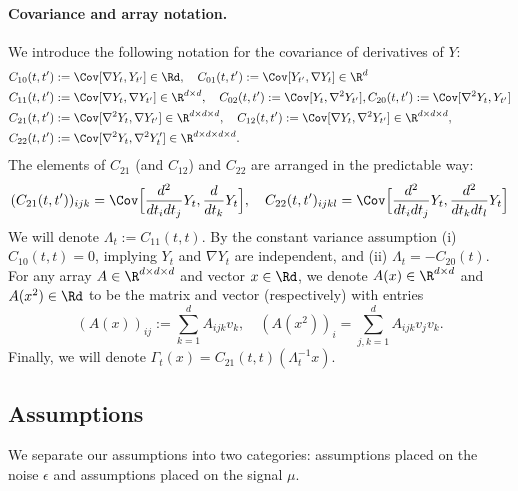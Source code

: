 \documentclass{article}
\begin{document}
	\paragraph{Covariance and array notation.}
	We introduce the following notation for the covariance of derivatives of $Y$:
	\begin{align*}
		C_{10}(t,t') & := \Cov[\nabla Y_t, Y_{t'}] \in \Rd, \quad  C_{01}(t,t') := \Cov[Y_{t'},\nabla Y_t] \in \R^{d}\\
		C_{11}(t,t') & := \Cov[\nabla Y_t,\nabla Y_{t'}] \in \R^{d \times d}, \quad C_{02}(t,t') := \Cov[Y_t,\nabla^2 Y_{t'}], C_{20}(t,t') := \Cov[\nabla^2 Y_t,Y_{t'}] \\
		C_{21}(t,t') & := \Cov[\nabla^2 Y_t, \nabla Y_{t'}] \in \R^{d \times d \times d}, \quad C_{12}(t,t') :=  \Cov[\nabla Y_t, \nabla^2 Y_{t'}] \in \R^{d \times d \times d},\\
		C_{22}(t,t') & := \Cov[\nabla^2 Y_t, \nabla^2 Y_t'] \in \R^{d \times d \times d \times d}.
	\end{align*}
	The elements of $C_{21}$ (and $C_{12}$) and $C_{22}$ are arranged in the predictable way: 
	$$
	(C_{21}(t,t'))_{ijk} = \Cov\Big[\frac{d^2}{dt_i dt_j}Y_t, \frac{d}{dt_k}Y_t\Big], \quad C_{22}(t,t')_{ijkl} = \Cov\Big[\frac{d^2}{dt_i dt_j}Y_t, \frac{d^2}{dt_k dt_l}Y_t\Big]
	$$
	We will denote $\Lambda_t := C_{11}(t,t)$. By the constant variance assumption (i) $C_{10}(t,t) = 0$, implying $Y_t$ and $\nabla Y_t$ are independent, and (ii) $\Lambda_t = -C_{20}(t)$. For any array $A \in \R^{d \times d \times d}$ and vector $x \in \Rd$, we denote $A(x) \in \R^{d \times d}$ and $A(x^2) \in \Rd$ to be the matrix and vector (respectively) with entries
	\begin{equation}
		\label{eqn:array-notaiton}
		(A(x))_{ij} := \sum_{k = 1}^{d} A_{ijk} v_k, \quad (A(x^2))_{i} = \sum_{j,k = 1}^{d} A_{ijk} v_j v_k.
	\end{equation}
	Finally, we will denote $\Gamma_t(x) = C_{21}(t,t)(\Lambda_t^{-1}x)$.
	
	\subsection{Assumptions}
	We separate our assumptions into two categories: assumptions placed on the noise $\epsilon$ and assumptions placed on the signal $\mu$.
	
\end{document}
